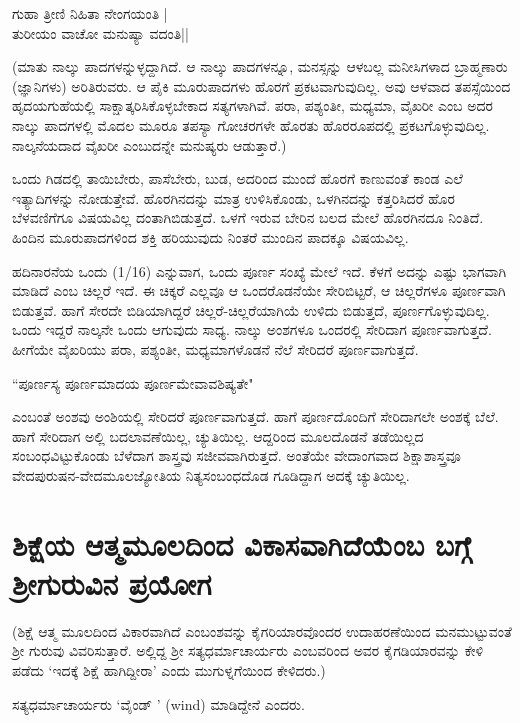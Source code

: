 \begin{shloka}
ಗುಹಾ ತ್ರೀಣಿ ನಿಹಿತಾ ನೇಂಗಯಂತಿ |\\
ತುರೀಯಂ ವಾಚೋ ಮನುಷ್ಯಾ ವದಂತಿ||
\end{shloka}

(ಮಾತು ನಾಲ್ಕು ಪಾದಗಳನ್ನುಳ್ಳದ್ದಾಗಿದೆ. ಆ ನಾಲ್ಕು  ಪಾದಗಳನ್ನೂ, ಮನಸ್ಸನ್ನು ಆಳಬಲ್ಲ ಮನೀಸಿಗಳಾದ ಬ್ರಾಹ್ಮಣಾರು (ಜ್ಞಾನಿಗಳು) ಅರಿತಿರುವರು. ಆ ಪೈಕಿ ಮೂರುಪಾದಗಳು ಹೊರಗೆ ಪ್ರಕಟವಾಗುವುದಿಲ್ಲ. ಅವು ಆಳವಾದ ತಪಸ್ಸೆಯಿಂದ ಹೃದಯಗುಹೆಯಲ್ಲಿ ಸಾಕ್ಷಾತ್ಕರಿಸಿಕೊಳ್ಳಬೇಕಾದ ಸತ್ಯಗಳಾಗಿವೆ. ಪರಾ, ಪಶ್ಯಂತೀ, ಮಧ್ಯಮಾ, ವೈಖರೀ ಎಂಬ ಅದರ ನಾಲ್ಕು  ಪಾದಗಳಲ್ಲಿ ಮೊದಲ ಮೂರೂ ತಪಸ್ಯಾ ಗೋಚರಗಳೇ ಹೊರತು ಹೊರರೂಪದಲ್ಲಿ ಪ್ರಕಟಗೊಳ್ಳುವುದಿಲ್ಲ. ನಾಲ್ಕನೆಯದಾದ ವೈಖರೀ ಎಂಬುದನ್ನೇ ಮನುಷ್ಯರು ಆಡುತ್ತಾರೆ.)

ಒಂದು ಗಿಡದಲ್ಲಿ ತಾಯಿಬೇರು, ಪಾಸೆಬೇರು, ಬುಡ, ಅದರಿಂದ ಮುಂದೆ ಹೊರಗೆ ಕಾಣುವಂತೆ ಕಾಂಡ ಎಲೆ ಇತ್ಯಾದಿಗಳನ್ನು ನೋಡುತ್ತೇವೆ. ಹೊರಗಿನದನ್ನು ಮಾತ್ರ ಉಳಿಸಿಕೊಂಡು, ಒಳಗಿನದನ್ನು ಕತ್ತರಿಸಿದರೆ ಹೊರ ಬೆಳವಣಿಗೆಗೂ ವಿಷಯವಿಲ್ಲ ದಂತಾಗಿಬಿಡುತ್ತದೆ. ಒಳಗೆ ಇರುವ ಬೇರಿನ ಬಲದ ಮೇಲೆ ಹೊರಗಿನದೂ ನಿಂತಿದೆ. ಹಿಂದಿನ ಮೂರುಪಾದಗಳಿಂದ ಶಕ್ತಿ ಹರಿಯುವುದು ನಿಂತರೆ ಮುಂದಿನ ಪಾದಕ್ಕೂ  ವಿಷಯವಿಲ್ಲ.

ಹದಿನಾರನೆಯ ಒಂದು (1/16) ಎನ್ನುವಾಗ, ಒಂದು ಪೂರ್ಣ ಸಂಖ್ಯೆ ಮೇಲೆ ಇದೆ. ಕೆಳಗೆ ಅದನ್ನು ಎಷ್ಟು ಭಾಗವಾಗಿ ಮಾಡಿದೆ ಎಂಬ ಚಿಲ್ಲರೆ ಇದೆ. ಈ ಚಿಕ್ಕರೆ ಎಲ್ಲವೂ ಆ ಒಂದರೊಡನೆಯೇ ಸೇರಿಬಿಟ್ಟರೆ, ಆ ಚಿಲ್ಲರೆಗಳೂ ಪೂರ್ಣವಾಗಿ ಬಿಡುತ್ತವೆ. ಹಾಗೆ ಸೇರದೇ ಬಿಡಿಯಾಗಿದ್ದರೆ ಚಿಲ್ಲರೆ-ಚಿಲ್ಲರೆಯಾಗಿಯೆ ಉಳಿದು ಬಿಡುತ್ತದೆ, ಪೂರ್ಣಗೊಳ್ಳುವುದಿಲ್ಲ. ಒಂದು ಇದ್ದರೆ ನಾಲ್ಕನೇ ಒಂದು ಆಗುವುದು ಸಾಧ್ಯ. ನಾಲ್ಕು ಅಂಶಗಳೂ ಒಂದರಲ್ಲಿ ಸೇರಿದಾಗ ಪೂರ್ಣವಾಗುತ್ತದೆ. ಹೀಗೆಯೇ ವೈಖರಿಯು ಪರಾ, ಪಶ್ಯಂತೀ, ಮಧ್ಯಮಾಗಳೊಡನೆ ನೆಲೆ ಸೇರಿದರೆ ಪೂರ್ಣವಾಗುತ್ತದೆ.
\begin{shloka}
``ಪೂರ್ಣಸ್ಯ ಪೂರ್ಣಮಾದಯ ಪೂರ್ಣಮೇವಾವಶಿಷ್ಯತೇ"
\end{shloka}

ಎಂಬಂತೆ ಅಂಶವು ಅಂಶಿಯಲ್ಲಿ ಸೇರಿದರೆ ಪೂರ್ಣವಾಗುತ್ತದೆ. ಹಾಗೆ ಪೂರ್ಣದೊಂದಿಗೆ ಸೇರಿದಾಗಲೇ ಅಂಶಕ್ಕೆ ಬೆಲೆ. ಹಾಗೆ ಸೇರಿದಾಗ ಅಲ್ಲಿ ಬದಲಾವಣೆಯಿಲ್ಲ, ಚ್ಯುತಿಯಿಲ್ಲ. ಆದ್ದರಿಂದ  ಮೂಲದೊಡನೆ ತಡೆಯಿಲ್ಲದ ಸಂಬಂಧವಿಟ್ಟುಕೊಂಡು ಬೆಳೆದಾಗ ಶಾಸ್ತ್ರವು ಸಜೀವವಾಗಿರುತ್ತದೆ. ಅಂತೆಯೇ ವೇದಾಂಗವಾದ ಶಿಕ್ಷಾಶಾಸ್ತ್ರವೂ ವೇದಪುರುಷನ-ವೇದಮೂಲಜ್ಯೋತಿಯ ನಿತ್ಯಸಂಬಂಧದೊಡ ಗೂಡಿದ್ದಾಗ  ಅದಕ್ಕೆ  ಚ್ಯುತಿಯಿಲ್ಲ.

\section*{ಶಿಕ್ಷೆಯ ಆತ್ಮಮೂಲದಿಂದ ವಿಕಾಸವಾಗಿದೆಯೆಂಬ ಬಗ್ಗೆ ಶ್ರೀಗುರುವಿನ ಪ್ರಯೋಗ}

(ಶಿಕ್ಷೆ ಆತ್ಮ ಮೂಲದಿಂದ ವಿಕಾರವಾಗಿದೆ ಎಂಬಂಶವನ್ನು ಕೈಗರಿಯಾರವೊಂದರ ಉದಾಹರಣೆಯಿಂದ ಮನಮುಟ್ಟುವಂತೆ ಶ್ರೀ ಗುರುವು ವಿವರಿಸುತ್ತಾರೆ. ಅಲ್ಲಿದ್ದ ಶ್ರೀ ಸತ್ಯಧರ್ಮಾಚಾರ್ಯರು  ಎಂಬವರಿಂದ ಅವರ ಕೈಗಡಿಯಾರವನ್ನು ಕೇಳಿ ಪಡೆದು `ಇದಕ್ಕೆ ಶಿಕ್ಷೆ ಹಾಗಿದ್ದೀರಾ' ಎಂದು ಮುಗುಳ್ನಗೆಯಿಂದ ಕೇಳಿದರು.)

ಸತ್ಯಧರ್ಮಾಚಾರ್ಯರು `ವೈಂಡ್ ' (wind) ಮಾಡಿದ್ದೇನೆ ಎಂದರು.

